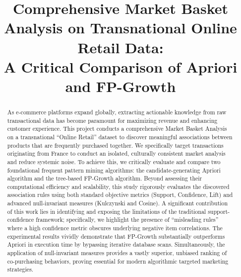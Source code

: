 \documentclass[conference]{IEEEtran}
\begin{document}
\title{Comprehensive Market Basket Analysis on Transnational Online Retail Data:\\A Critical Comparison of Apriori and FP-Growth}

\author{
}

\maketitle

\begin{abstract}
As e-commerce platforms expand globally, extracting actionable knowledge from raw transactional data has become paramount for maximizing revenue and enhancing customer experience. This project conducts a comprehensive Market Basket Analysis on a transnational ``Online Retail'' dataset to discover meaningful associations between products that are frequently purchased together. We specifically target transactions originating from France to conduct an isolated, culturally consistent market analysis and reduce systemic noise. To achieve this, we critically evaluate and compare two foundational frequent pattern mining algorithms: the candidate-generating Apriori algorithm and the tree-based FP-Growth algorithm. Beyond assessing their computational efficiency and scalability, this study rigorously evaluates the discovered association rules using both standard objective metrics (Support, Confidence, Lift) and advanced null-invariant measures (Kulczynski and Cosine). A significant contribution of this work lies in identifying and exposing the limitations of the traditional support-confidence framework; specifically, we highlight the presence of ``misleading rules'' where a high confidence metric obscures underlying negative item correlations. The experimental results vividly demonstrate that FP-Growth substantially outperforms Apriori in execution time by bypassing iterative database scans. Simultaneously, the application of null-invariant measures provides a vastly superior, unbiased ranking of co-purchasing behaviors, proving essential for modern algorithmic targeted marketing strategies.
\end{abstract}
\end{document}

